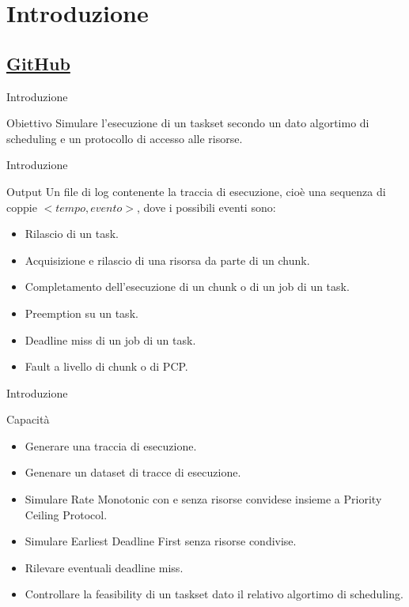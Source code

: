 \section{Introduzione}
\subsection{\href{https://github.com/edoardosarri24/real-time-scheduling-simulator.git}{GitHub}}

\begin{frame}{Introduzione}
    \begin{block}{Obiettivo}
        Simulare l'esecuzione di un taskset secondo un dato algortimo di scheduling e un protocollo di accesso alle risorse.
    \end{block}
\end{frame}

\begin{frame}{Introduzione}
    \begin{block}{Output}
        Un file di log contenente la traccia di esecuzione, cioè una sequenza di coppie $<tempo,evento>$, dove i possibili eventi sono:
        \begin{itemize}
            \item Rilascio di un task.
            \item Acquisizione e rilascio di una risorsa da parte di un chunk.
            \item Completamento dell'esecuzione di un chunk o di un job di un task.
            \item Preemption su un task.
            \item Deadline miss di un job di un task.
            \item Fault a livello di chunk o di PCP.
        \end{itemize}
    \end{block}
\end{frame}

\begin{frame}{Introduzione}
    \begin{block}{Capacità}
        \begin{itemize}
            \item Generare una traccia di esecuzione.
            \item Genenare un dataset di tracce di esecuzione.
            \item Simulare Rate Monotonic con e senza risorse convidese insieme a Priority Ceiling Protocol.
            \item Simulare Earliest Deadline First senza risorse condivise.
            \item Rilevare eventuali deadline miss.
            \item Controllare la feasibility di un taskset dato il relativo algortimo di scheduling.
        \end{itemize}
    \end{block}
\end{frame}

